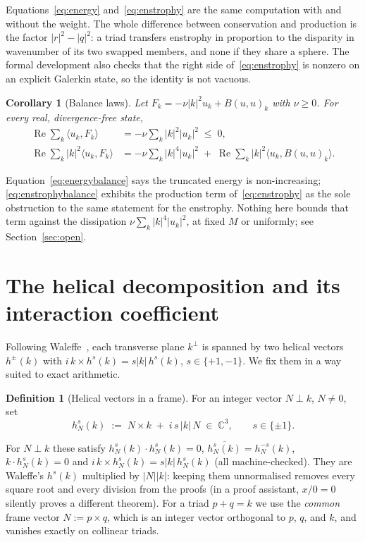 \documentclass[11pt]{amsart}
\newcommand{\C}{\mathbb{C}}
\theoremstyle{plain}
\newtheorem{corollary}[theorem]{Corollary}
\theoremstyle{definition}
\newtheorem{definition}[theorem]{Definition}
\theoremstyle{remark}
\begin{document}
Equations~\eqref{eq:energy} and~\eqref{eq:enstrophy} are the same computation with and without the
weight. The whole difference between conservation and production is the factor $|r|^2 - |q|^2$: a
triad transfers enstrophy in proportion to the disparity in wavenumber of its two swapped members,
and none if they share a sphere. The formal development also checks that the right side
of~\eqref{eq:enstrophy} is nonzero on an explicit Galerkin state, so the identity is not vacuous.

\begin{corollary}[Balance laws]
\label{cor:balance}
Let $F_k = -\nu|k|^2 u_k + B(u,u)_k$ with $\nu \ge 0$. For every real, divergence-free state,
\begin{align}
  \operatorname{Re} \sum_k \langle u_k, F_k \rangle &= -\nu \sum_k |k|^2 |u_k|^2 \;\le\; 0,
  \label{eq:energybalance}\\
  \operatorname{Re} \sum_k |k|^2 \langle u_k, F_k \rangle
  &= -\nu \sum_k |k|^4 |u_k|^2 \;+\; \operatorname{Re} \sum_k |k|^2\langle u_k, B(u,u)_k \rangle.
  \label{eq:enstrophybalance}
\end{align}
\end{corollary}

Equation~\eqref{eq:energybalance} says the truncated energy is non-increasing;
\eqref{eq:enstrophybalance} exhibits the production term of~\eqref{eq:enstrophy} as the sole
obstruction to the same statement for the enstrophy. Nothing here bounds that term against the
dissipation $\nu \sum_k |k|^4 |u_k|^2$, at fixed $M$ or uniformly; see Section~\ref{sec:open}.

\section{The helical decomposition and its interaction coefficient}
\label{sec:helical}

Following Waleffe~\cite{waleffe1992}, each transverse plane $k^\perp$ is spanned by two
helical vectors $h^{\pm}(k)$ with $i\,k \times h^{s}(k) = s|k|\,h^{s}(k)$, $s \in \{+1,-1\}$. We
fix them in a way suited to exact arithmetic.

\begin{definition}[Helical vectors in a frame]
\label{def:h}
For an integer vector $N \perp k$, $N \ne 0$, set
\[
  h^{s}_N(k) \;:=\; N \times k \;+\; i\,s\,|k|\,N \;\in\; \C^3, \qquad s \in \{\pm 1\}.
\]
\end{definition}

For $N \perp k$ these satisfy $h^s_N(k)\cdot h^s_N(k) = 0$, $\overline{h^s_N(k)} = h^{-s}_N(k)$,
$k \cdot h^s_N(k) = 0$ and $i\,k \times h^s_N(k) = s|k|\,h^s_N(k)$ (all machine-checked). They are
Waleffe's $h^s(k)$ multiplied by $|N||k|$: keeping them unnormalised removes every square root and
every division from the proofs (in a proof assistant, $x/0 = 0$ silently proves a different
theorem). For a triad $p + q = k$ we use the \emph{common} frame vector $N := p \times q$, which is
an integer vector orthogonal to $p$, $q$, and $k$, and vanishes exactly on collinear triads.
\end{document}
